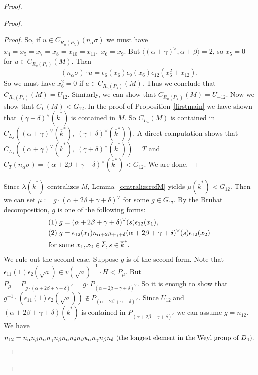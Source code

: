 \begin{proof}
\begin{proof}
\begin{proof}
So, if $u\in C_{R_u(P_\lambda)}(n_\alpha \sigma)$ we must have
$x_4=x_5=x_7=x_{8}=x_{10}=x_{11},\; x_6=x_9$. But $\langle (\alpha+\gamma)^{\vee}, \alpha+\beta \rangle =2$, so $x_5=0$ for $u\in C_{R_u(P_\lambda)}(M)$. Then 
\begin{equation*}
(n_\alpha \sigma)\cdot u = \epsilon_6(x_6)\epsilon_9(x_6)\epsilon_{12}(x_6^2+x_{12}).
\end{equation*}
So we must have $x_6^2=0$ if $u\in C_{R_u(P_\lambda)}(M)$. Thus we conclude that $C_{R_u(P_\lambda)}(M)=U_{12}$. Similarly, we can show that $C_{R_u(P_{\lambda}^{-})}(M)=U_{-12}$. Now we show that $C_L(M)<G_{12}$. In the proof of Proposition~\ref{firstmain} we have shown that $(\gamma+\delta)^{\vee}(\overline k^*)$ is contained in $M$. So $C_{L_\lambda}(M)$ is contained in $C_{L_\lambda}((\alpha+\gamma)^{\vee}(\overline k^*),\; (\gamma+\delta)^{\vee}(\overline k^*))$. A direct computation shows that $C_{L_\lambda}((\alpha+\gamma)^{\vee}(\overline k^*),\; (\gamma+\delta)^{\vee}(\overline k^*)) = T$ and $C_T(n_\alpha \sigma)=(\alpha+2\beta+\gamma+\delta)^{\vee}(\overline k^*)<G_{12}$. We are done.
\end{proof}
Since $\lambda(\overline k^*)$ centralizes $M$, Lemma~\ref{centralizerofM} yields $\mu(\overline k^*)<G_{12}$. Then we can set $\mu:=g\cdot (\alpha+2\beta+\gamma+\delta)^{\vee}$ for some $g\in G_{12}$. By the Bruhat decomposition, $g$ is one of the following forms:
\begin{alignat*}{2}
&(1)\;g=(\alpha+2\beta+\gamma+\delta)^{\vee}(s)\epsilon_{12}(x_1),\\
&(2)\;g=\epsilon_{12}(x_1)n_{\alpha+2\beta+\gamma+\delta}(\alpha+2\beta+\gamma+\delta)^{\vee}(s)\epsilon_{12}(x_2)\\
&\textup{for some } x_1, x_2\in \overline k, s\in \overline k^*.
\end{alignat*}
We rule out the second case. Suppose $g$ is of the second form. Note that $\epsilon_{11}(1)\epsilon_{2}(\sqrt a)\in v(\sqrt a)^{-1}\cdot H< P_\mu$. 
But $P_\mu=P_{g\cdot (\alpha+2\beta+\gamma+\delta)^{\vee}}=g\cdot P_{(\alpha+2\beta+\gamma+\delta)^{\vee}}$. So it is enough to show that $g^{-1}\cdot (\epsilon_{11}(1)\epsilon_{2}(\sqrt a))\notin P_{(\alpha+2\beta+\gamma+\delta)^{\vee}}$. Since $U_{12}$ and $(\alpha+2\beta+\gamma+\delta)(\overline k^*)$ is contained in $P_{(\alpha+2\beta+\gamma+\delta)^{\vee}}$ we can assume $g=n_{12}$. We have
\begin{equation*}
n_{12}=n_\alpha n_\beta n_\alpha n_\gamma n_\beta n_\alpha n_\delta n_\beta n_\alpha n_\gamma n_\beta n_\delta \textup{ (the longest element in the Weyl group of $D_4$)}.

\end{equation*}
\end{proof}
\end{proof}
